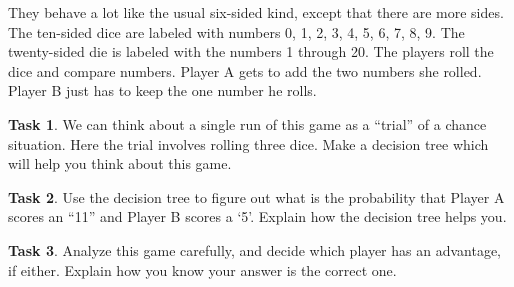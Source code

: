 \documentclass[12pt,letterpaper]{article}
\theoremstyle{definition}
\newtheorem{task}{Task}
\begin{document}
They behave a lot like the usual six-sided kind, except that there are more sides. The ten-sided dice are labeled with numbers 0, 1, 2, 3, 4, 5, 6, 7, 8, 9. The twenty-sided die is labeled with the numbers 1 through 20. The players roll the dice and compare numbers. Player A gets to add the two numbers she rolled. Player B just has to keep the one number he rolls.

\begin{task}
We can think about a single run of this game as a ``trial'' of a chance situation. Here the trial involves rolling three dice. Make a decision tree which will help you think about this game. 
\end{task}

\begin{task}
Use the decision tree to figure out what is the probability that Player A scores an ``11'' and Player B scores a `5'.
Explain how the decision tree helps you.
\end{task}

\begin{task}
Analyze this game carefully, and decide which player has an advantage, if either. Explain how you know your answer is the correct one.
\end{task}
\end{document}
